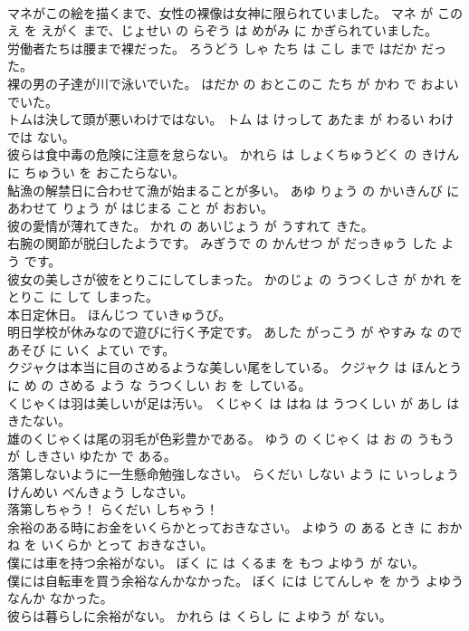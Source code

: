\documentclass[8pt]{extreport}
\begin{document}
\begin{CJK}{UTF8}{min}
\\	マネがこの絵を描くまで、女性の裸像は女神に限られていました。	マネ が この え を えがく まで、じょせい の らぞう は めがみ に かぎられていました。	
\\	労働者たちは腰まで裸だった。	ろうどう しゃ たち は こし まで はだか だっ た。	
\\	裸の男の子達が川で泳いでいた。	はだか の おとこのこ たち が かわ で およいでいた。	
\\	トムは決して頭が悪いわけではない。	トム は けっして あたま が わるい わけ では ない。	
\\	彼らは食中毒の危険に注意を怠らない。	かれら は しょくちゅうどく の きけん に ちゅうい を おこたらない。	
\\	鮎漁の解禁日に合わせて漁が始まることが多い。	あゆ りょう の かいきんび に あわせて りょう が はじまる こと が おおい。	
\\	彼の愛情が薄れてきた。	かれ の あいじょう が うすれて きた。	
\\	右腕の関節が脱臼したようです。	みぎうで の かんせつ が だっきゅう した よう です。	
\\	彼女の美しさが彼をとりこにしてしまった。	かのじょ の うつくしさ が かれ を とりこ に して しまった。	
\\	本日定休日。	ほんじつ ていきゅうび。	
\\	明日学校が休みなので遊びに行く予定です。	あした がっこう が やすみ な ので あそび に いく よてい です。	
\\	クジャクは本当に目のさめるような美しい尾をしている。	クジャク は ほんとうに め の さめる よう な うつくしい お を している。	
\\	くじゃくは羽は美しいが足は汚い。	くじゃく は はね は うつくしい が あし は きたない。	
\\	雄のくじゃくは尾の羽毛が色彩豊かである。	ゆう の くじゃく は お の うもう が しきさい ゆたか で ある。	
\\	落第しないように一生懸命勉強しなさい。	らくだい しない よう に いっしょうけんめい べんきょう しなさい。	
\\	落第しちゃう！	らくだい しちゃう！	
\\	余裕のある時にお金をいくらかとっておきなさい。	よゆう の ある とき に おかね を いくらか とって おきなさい。	
\\	僕には車を持つ余裕がない。	ぼく に は くるま を もつ よゆう が ない。	
\\	僕には自転車を買う余裕なんかなかった。	ぼく には じてんしゃ を かう よゆう なんか なかった。	
\\	彼らは暮らしに余裕がない。	かれら は くらし に よゆう が ない。	

\end{CJK}
\end{document}
